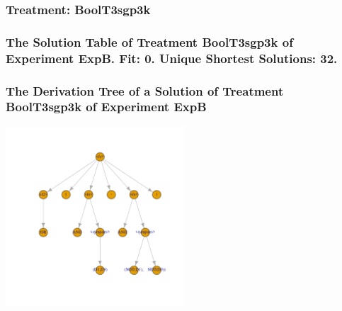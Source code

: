 \documentclass[18pt,c]{beamer}
\begin{document}
 \begin{frame}
 \fontsize{8pt}{9pt}\selectfont
 \frametitle{ Treatment: BoolT3sgp3k }

 \label{ExpBStatsTable023.tex}  
 \end{frame}

 \begin{frame}
 \fontsize{8pt}{9pt}\selectfont
 \frametitle{ The Solution Table of Treatment BoolT3sgp3k of Experiment ExpB. Fit: 0. Unique Shortest Solutions: 32. }

 \label{ExpBSolutionTable016.tex}  
 \end{frame}

 \begin{frame}
 \frametitle{ The Derivation Tree of a Solution of Treatment BoolT3sgp3k of Experiment ExpB }
 \begin{center}
\includegraphics[width=0.5\textwidth, angle=0]
{ExpBDerivationTreeFigure016.pdf}
 \end{center}
 \label{report/ExpBDerivationTreeFigure016.pdf}  
 \end{frame}
\end{document}

